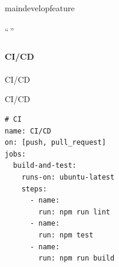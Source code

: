 \important{}


maindevelopfeature



\hypertarget{section-80}{%
\paragraph{}\label{section-80}}

\important{}

\important{}

\important{}``\,''

\important{}

\hypertarget{section-81}{%
\subsubsection{}\label{section-81}}

\hypertarget{cicd}{%
\paragraph{CI/CD}\label{cicd}}

\important{}

\important{}

\hypertarget{section-82}{%
\paragraph{}\label{section-82}}

CI/CD


CI/CD



\begin{lstlisting}
# CI
name: CI/CD
on: [push, pull_request]
jobs:
  build-and-test:
    runs-on: ubuntu-latest
    steps:
      - name: 
        run: npm run lint
      - name:   
        run: npm test
      - name: 
        run: npm run build
\end{lstlisting}

\hypertarget{section-83}{%
\subsubsection{}\label{section-83}}

\hypertarget{section-84}{%
\paragraph{}\label{section-84}}

